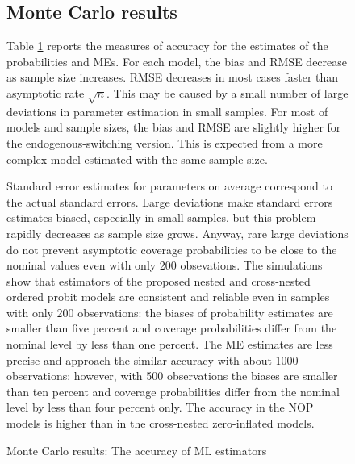 \documentclass[letterpaper,fleqn,12pt]{article}
\begin{document}
\begin{figure}[H]
\begin{onehalfspace}
\subsection{Monte Carlo results}

Table \ref{MC_results} reports the measures of accuracy for the estimates of
the probabilities and MEs. For each model, the bias and RMSE decrease as
sample size increases. RMSE decreases in most cases faster than asymptotic
rate $\sqrt{n}$. This may be caused by a small number of large deviations in
parameter estimation in small samples. For most of models and sample sizes,
the bias and RMSE are slightly higher for the endogenous-switching version.
This is expected from a more complex model estimated with the same sample
size.

Standard error estimates for parameters on average correspond to the actual
standard errors. Large deviations make standard errors estimates biased,
especially in small samples, but this problem rapidly decreases as sample
size grows. Anyway, rare large deviations do not prevent asymptotic coverage
probabilities to be close to the nominal values even with only 200
obsevations. The simulations show that estimators of the proposed nested and
cross-nested ordered probit models are consistent and reliable even in
samples with only 200 observations: the biases of probability estimates are
smaller than five percent and coverage probabilities differ from the nominal
level by less than one percent. The ME estimates are less precise and
approach the similar accuracy with about 1000 observations: however, with
500 observations the biases are smaller than ten percent and coverage
probabilities differ from the nominal level by less than four percent only.
The accuracy in the NOP models is higher than in the cross-nested
zero-inflated models.

\end{onehalfspace}%
\begin{table}[H] \captionsetup{singlelinecheck = false, justification=justified}%

\caption{Monte Carlo results: The accuracy of ML
estimators\label{MC_results}}%
\centering%


\end{table}
\end{figure}
\end{document}
